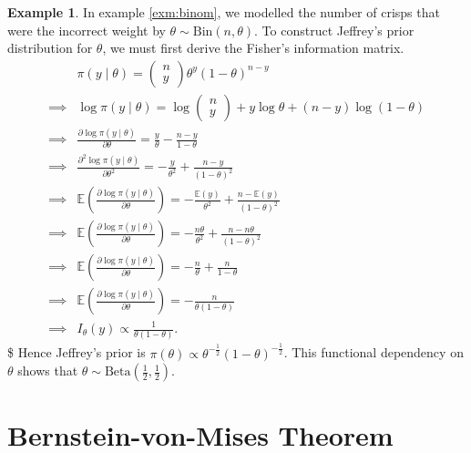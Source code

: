 \documentclass[
]{book}
\theoremstyle{definition}
\theoremstyle{definition}
\newtheorem{example}{Example}[chapter]
\theoremstyle{definition}
\theoremstyle{definition}
\theoremstyle{remark}
\begin{document}
\begin{example}
In example \ref{exm:binom}, we modelled the number of crisps that were the incorrect weight by \(\theta \sim \textrm{Bin}(n, \theta)\). To construct Jeffrey's prior distribution for \(\theta\), we must first derive the Fisher's information matrix.\\
\begin{align*}
&\pi(y \mid \theta) = \begin{pmatrix} n \\ y \end{pmatrix} \theta^y (1-\theta)^{n-y}\\ 
\implies &\log \pi(y \mid \theta) = \log \begin{pmatrix} n \\ y \end{pmatrix} + y \log\theta + (n-y)\log(1-\theta) \\
\implies &\frac{\partial \log \pi(y \mid \theta)}{\partial \theta} = \frac{y}{\theta} - \frac{n-y}{1-\theta} \\
\implies &\frac{\partial^2 \log \pi(y \mid \theta)}{\partial \theta^2} = -\frac{y}{\theta^2} + \frac{n-y}{(1-\theta)^2} \\
\implies &\mathbb{E}\left(\frac{\partial \log \pi(y \mid \theta)}{\partial \theta}\right) = -\frac{\mathbb{E}(y)}{\theta^2} + \frac{n-\mathbb{E}(y)}{(1-\theta)^2}\\ 
\implies &\mathbb{E}\left(\frac{\partial \log \pi(y \mid \theta)}{\partial \theta}\right) = -\frac{n\theta}{\theta^2} + \frac{n-n\theta}{(1-\theta)^2}\\ 
\implies &\mathbb{E}\left(\frac{\partial \log \pi(y \mid \theta)}{\partial \theta}\right) = -\frac{n}{\theta} + \frac{n}{1-\theta}\\
\implies &\mathbb{E}\left(\frac{\partial \log \pi(y \mid \theta)}{\partial \theta}\right) = -\frac{n}{\theta(1-\theta)} \\
\implies &I_\theta(y) \propto \frac{1}{\theta(1-\theta)}.
\end{align*}
\$
Hence Jeffrey's prior is \(\pi(\theta) \propto \theta^{-\frac{1}{2}}(1-\theta)^{-\frac{1}{2}}\). This functional dependency on \(\theta\) shows that \(\theta \sim \textrm{Beta}(\frac{1}{2}, \frac{1}{2})\).
\end{example}

\hypertarget{bernstein-von-mises-theorem}{%
\section{Bernstein-von-Mises Theorem}\label{bernstein-von-mises-theorem}}
\end{document}
